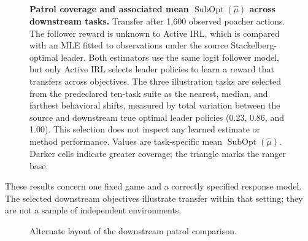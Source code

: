 \begin{figure}[t]
  \centering
  \caption{\textbf{Patrol coverage and associated mean
  $\operatorname{SubOpt}(\hat\mu)$ across downstream tasks.} Transfer after
  1,600 observed poacher actions. The follower reward is unknown to Active IRL,
  which is compared with an MLE fitted to observations under the source
  Stackelberg-optimal leader. Both estimators use the same logit follower model, but only Active IRL
  selects leader policies to learn a reward that transfers across objectives.
  The three illustration tasks are selected from the predeclared ten-task suite
  as the nearest, median, and farthest behavioral shifts, measured by total
  variation between the source and downstream true optimal leader policies
  (0.23, 0.86, and 1.00). This selection does not inspect any learned estimate
  or method performance. Values are task-specific mean
  $\operatorname{SubOpt}(\hat\mu)$. Darker
  cells indicate greater coverage; the triangle marks the ranger base.}
  \label{fig:downstream-transfer}
\end{figure}

These results concern one fixed game and a correctly specified response model.
The selected downstream objectives illustrate transfer within that setting;
they are not a sample of independent environments.

\begin{figure}[p]
  \centering
  \resizebox{\textwidth}{!}{%
  }
  \caption{Alternate layout of the downstream patrol comparison.}
\end{figure}
